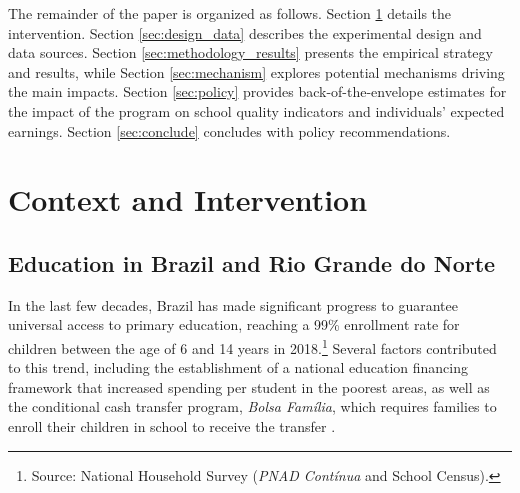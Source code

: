 \documentclass[11pt,a4paper]{article}
\begin{document}

The remainder of the paper is organized as follows. Section \ref{sec:context} details the intervention. Section \ref{sec:design_data} describes the experimental design and data sources. Section \ref{sec:methodology_results} presents the empirical strategy and results, while Section \ref{sec:mechanism} explores potential mechanisms driving the main impacts. Section \ref{sec:policy} provides back-of-the-envelope estimates for the impact of the program on school quality indicators and individuals' expected earnings. Section \ref{sec:conclude} concludes with policy recommendations.


\section{Context and Intervention} \label{sec:context}

\subsection{Education in Brazil and Rio Grande do Norte} \label{sec:brazil}

In the last few decades, Brazil has made significant progress to guarantee universal access to primary education, reaching a 99\% enrollment rate for children between the age of 6 and 14 years in 2018.\footnote{Source: National Household Survey (\textit{PNAD Contínua} and School Census).} Several factors contributed to this trend, including the establishment of a national education financing framework that increased spending per student in the poorest areas, as well as the conditional cash transfer program, \textit{Bolsa Família}, which requires families to enroll their children in school to receive the transfer \citep{glewwe2012impact}. 
\end{document}
